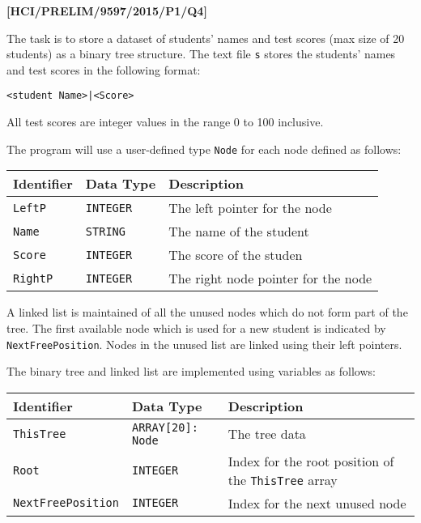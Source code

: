 \item \textbf{{[}HCI/PRELIM/9597/2015/P1/Q4{]} }

The task is to store a dataset of students\textquoteright{} names
and test scores (max size of 20 students) as a binary tree structure.
The text file \texttt{s} stores the students\textquoteright{} names
and test scores in the following format:
\noindent \begin{center}
\texttt{<student Name>|<Score> }
\par\end{center}

All test scores are integer values in the range 0 to 100 inclusive. 

The program will use a user-defined type \texttt{Node} for each node
defined as follows: 
\begin{center}
\begin{tabular}{|l|l|l|}
\hline 
\texttt{\textbf{\hspace{0.01\columnwidth}}}\textbf{Identifier} & \texttt{\textbf{\hspace{0.01\columnwidth}}}\textbf{Data Type} & \texttt{\textbf{\hspace{0.05\columnwidth}}}\textbf{Description}\tabularnewline
\hline 
\texttt{LeftP} & \texttt{INTEGER} & The left pointer for the node\tabularnewline
\hline 
\texttt{Name} & \texttt{STRING} & The name of the student\tabularnewline
\hline 
\texttt{Score} & \texttt{INTEGER} & The score of the studen\tabularnewline
\hline 
\texttt{RightP} & \texttt{INTEGER} & The right node pointer for the node\tabularnewline
\hline 
\end{tabular}
\par\end{center}

A linked list is maintained of all the unused nodes which do not form
part of the tree. The first available node which is used for a new
student is indicated by \texttt{NextFreePosition}. Nodes in the unused
list are linked using their left pointers. 

The binary tree and linked list are implemented using variables as
follows:
\begin{center}
\begin{tabular}{|l|l|l|}
\hline 
\texttt{\textbf{\hspace{0.01\columnwidth}}}\textbf{Identifier} & \texttt{\textbf{\hspace{0.01\columnwidth}}}\textbf{Data Type} & \texttt{\textbf{\hspace{0.05\columnwidth}}}\textbf{Description}\tabularnewline
\hline 
\texttt{ThisTree} & \texttt{ARRAY{[}20{]}: Node} & The tree data\tabularnewline
\hline 
\texttt{Root} & \texttt{INTEGER} & Index for the root position of the \texttt{ThisTree} array\tabularnewline
\hline 
\texttt{NextFreePosition} & \texttt{INTEGER} & Index for the next unused node\tabularnewline
\hline 
\end{tabular}
\par\end{center}

